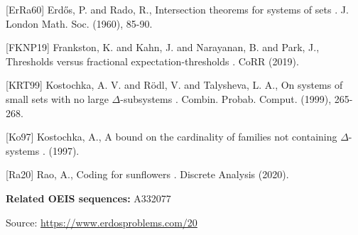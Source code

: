 \documentclass{article}
\begin{document}
[ErRa60] Erd\H{o}s, P. and Rado, R., Intersection theorems for systems of sets . J. London Math. Soc. (1960), 85-90.

[FKNP19] Frankston, K. and Kahn, J. and Narayanan, B. and Park, J., Thresholds versus fractional expectation-thresholds . CoRR (2019).

[KRT99] Kostochka, A. V. and R\"{o}dl, V. and Talysheva, L. A., On systems of small sets with no large $\Delta$-subsystems . Combin. Probab. Comput. (1999), 265-268.

[Ko97] Kostochka, A., A bound on the cardinality of families not containing $\Delta$-systems . (1997).

[Ra20] Rao, A., Coding for sunflowers . Discrete Analysis (2020).

\noindent\textbf{Related OEIS sequences:} A332077


\bigskip
\noindent\small{Source: \url{https://www.erdosproblems.com/20}}
\end{document}
